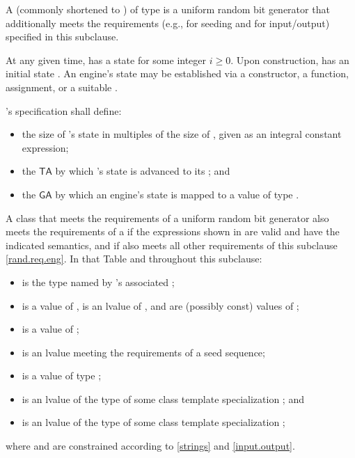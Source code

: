 \pnum
A 
(commonly shortened to )
 of type 
is a uniform random bit generator
that additionally meets the requirements
(e.g., for seeding and for input/output)
specified in this subclause.

\pnum
At any given time,
 has a state 
for some integer $i \geq 0$.
Upon construction,
has an initial state .
An engine's state may be established via
 a constructor,
 a  function,
 assignment,
 or a suitable .

\pnum
{}'s specification shall define:
\begin{itemize}
 \item
   the size of 's state
   in multiples of the size of ,
   given as an integral constant expression;
 \item
   the 
   $\mathsf{TA}$
   by which 's state 
   is advanced to its 
   ;
 and
 \item
   the 
   $\mathsf{GA}$
   by which an engine's state is mapped
   to a value of type .
\end{itemize}

\pnum
A class 
that meets the requirements
of a uniform random bit generator
also meets the requirements
of a 
if the expressions shown
in 
are valid and have the indicated semantics,
and if  also meets all other requirements
of this subclause \ref{rand.req.eng}.
In that Table and throughout this subclause:
\begin{itemize}
  \item
     is the type named by
    's associated ;
  \item
     is a value of ,
     is an lvalue of ,
     and  are (possibly const) values of ;
  \item
     is a value of ;
  \item
     is an lvalue
    meeting the requirements of a seed sequence;
  \item
     is a value
    of type ;
  \item
     is an lvalue of the type of some class template specialization
     ;
  and
  \item
     is an lvalue of the type of some class template specialization
     ;
\end{itemize}
where  and  are constrained
according to \ref{strings} and \ref{input.output}.

